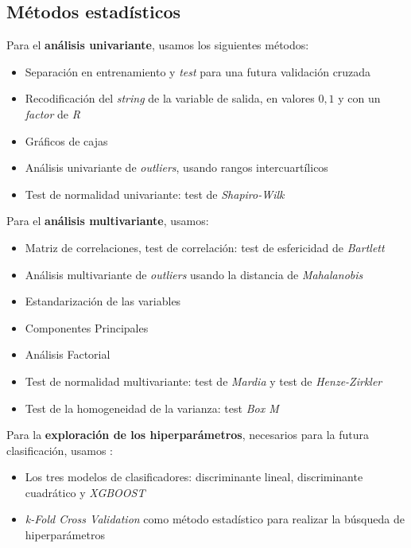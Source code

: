 \documentclass[11pt]{article}
\begin{document}
\subsection{Métodos estadísticos}

Para el \textbf{análisis univariante}, usamos los siguientes métodos:

\begin{itemize}
    \item Separación en entrenamiento y \textit{test} para una futura validación cruzada
    \item Recodificación del \textit{string} de la variable de salida, en valores $0, 1$ y con un \textit{factor} de \textit{R}
    \item Gráficos de cajas
    \item Análisis univariante de \textit{outliers}, usando rangos intercuartílicos
    \item Test de normalidad univariante: test de \textit{Shapiro-Wilk}
\end{itemize}

Para el \textbf{análisis multivariante}, usamos:


\begin{itemize}
    \item Matriz de correlaciones, test de correlación: test de esfericidad de \textit{Bartlett}
    \item Análisis multivariante de \textit{outliers} usando la distancia de \textit{Mahalanobis}
    \item Estandarización de las variables
    \item Componentes Principales
    \item Análisis Factorial
    \item Test de normalidad multivariante: test de \textit{Mardia} y test de \textit{Henze-Zirkler}
    \item Test de la homogeneidad de la varianza: test \textit{Box M}
\end{itemize}

Para la \textbf{exploración de los hiperparámetros}, necesarios para la futura clasificación, usamos \footnotemark:


\begin{itemize}
    \item Los tres modelos de clasificadores: discriminante lineal, discriminante cuadrático y \textit{XGBOOST}
    \item \textit{k-Fold Cross Validation} como método estadístico para realizar la búsqueda de hiperparámetros
\end{itemize}
\end{document}
